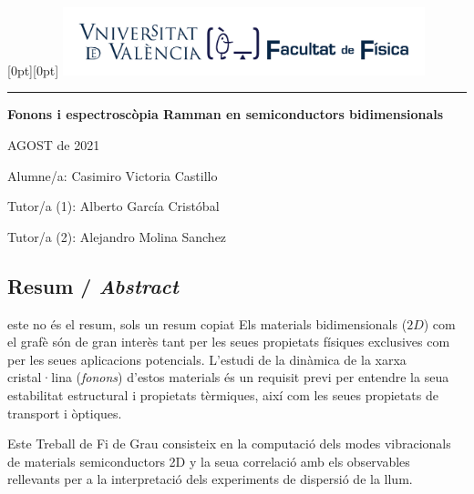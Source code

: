 \documentclass[12pt]{article} %
\author{Casimiro Victoria Castillo}
\begin{document}
\begin{titlepage}
   \noindent\raisebox{0pt}[0pt][0pt]{
	\includegraphics[width=10.5cm]{./portada-TFG-LaTeX/marca-Facultat-Fisica-UV-1-linia.pdf}}\par
   \vspace{8.5cm}
   {\centering
      \par
      \rule{16.13cm}{1.5pt}\par
      \vspace{4.5cm}
      {\bfseries\sffamily\LARGE Fonons i espectroscòpia Ramman en semiconductors bidimensionals}\par
   }
   \vfill
   {\raggedleft\sffamily
		AGOST de 2021\par
      \vspace{\baselineskip}
		Alumne/a: Casimiro Victoria Castillo\par
      \vspace{\baselineskip}
		Tutor/a (1): Alberto García Cristóbal\par
		Tutor/a (2): Alejandro Molina Sanchez\par
   }
\end{titlepage}
\restoregeometry


\subsection*{Resum / \emph{Abstract}}
este no és el resum, sols un resum copiat
Els materials bidimensionals ($2D$) com el grafè són de gran interès tant per les seues propietats físiques exclusives com per les seues aplicacions potencials. L'estudi de la dinàmica de la xarxa cristal·lina (\textit{fonons}) d'estos materials és un requisit previ per entendre la seua estabilitat estructural i propietats tèrmiques, així com les seues propietats de transport i òptiques.   


Este Treball de Fi de Grau consisteix en la computació dels modes vibracionals de materials semiconductors 2D y la seua correlació amb els observables rellevants per a la interpretació dels experiments de dispersió de la llum.
\vspace{\baselineskip}
\end{document}
